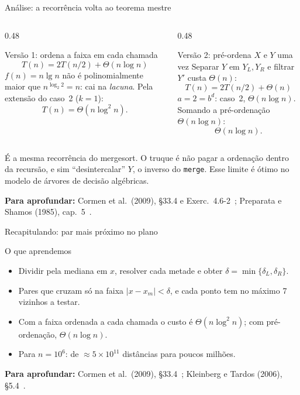 \documentclass[aspectratio=169,xcolor=table]{beamer}
\newcommand{\fonte}[1]{%
  \vfill
  {\tiny\color{gray!55!black}\textbf{Para aprofundar:} #1\par}%
}
\begin{document}
\begin{frame}{Análise: a recorrência volta ao teorema mestre}
  \begin{columns}[T]
    \begin{column}{0.48\textwidth}
      \begin{block}{Versão 1: ordena a faixa em cada chamada}
        \scriptsize
        \[ T(n)=2T(n/2)+\Theta(n\log n) \]
        $f(n)=n\lg n$ não é polinomialmente maior que $n^{\log_2 2}=n$:
        cai na \emph{lacuna}. Pela extensão do caso~2 ($k=1$):
        \[ T(n)=\Theta(n\log^2 n). \]
      \end{block}
    \end{column}
    \begin{column}{0.48\textwidth}
      \begin{block}{Versão 2: pré-ordena $X$ e $Y$ uma vez}
        \scriptsize
        Separar $Y$ em $Y_L,Y_R$ e filtrar $Y'$ custa $\Theta(n)$:
        \[ T(n)=2T(n/2)+\Theta(n) \]
        $a=2=b^d$: caso~2, $\Theta(n\log n)$.\\
        Somando a pré-ordenação $\Theta(n\log n)$:
        \[ \Theta(n\log n). \]
      \end{block}
    \end{column}
  \end{columns}
  \medskip
  {\scriptsize É a mesma recorrência do mergesort. O truque é não pagar a ordenação
  dentro da recursão, e sim ``desintercalar'' $Y$, o inverso do \texttt{merge}.
  Esse limite é ótimo no modelo de árvores de decisão algébricas.}
  \fonte{Cormen et al.\ (2009), \S 33.4 e Exerc.~4.6-2~\cite{cormen2009introduction};
    Preparata e Shamos (1985), cap.~5~\cite{preparata1985computational}.}
\end{frame}

\begin{frame}{Recapitulando: par mais próximo no plano}
  \begin{block}{O que aprendemos}
    \begin{itemize}\small
      \item Dividir pela mediana em $x$, resolver cada metade e obter $\delta=\min\{\delta_L,\delta_R\}$.
      \item Pares que cruzam só na faixa $|x-x_m|<\delta$, e cada ponto tem no máximo 7 vizinhos a testar.
      \item Com a faixa ordenada a cada chamada o custo é $\Theta(n\log^2 n)$; com pré-ordenação, $\Theta(n\log n)$.
      \item Para $n=10^6$: de $\approx 5\times 10^{11}$ distâncias para poucos milhões.
    \end{itemize}
  \end{block}
  \fonte{Cormen et al.\ (2009), \S 33.4~\cite{cormen2009introduction};
    Kleinberg e Tardos (2006), \S 5.4~\cite{kleinberg2006algorithm}.}
\end{frame}
\end{document}
